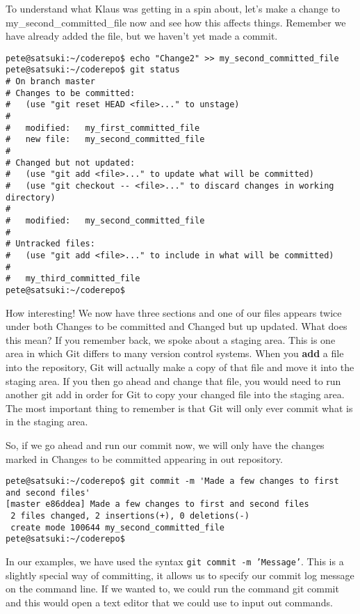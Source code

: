 To understand what Klaus was getting in a spin about, let's make a change to my\_second\_committed\_file now and see how this affects things.  Remember we have already added the file, but we haven't yet made a commit.

\begin{verbatim} 
pete@satsuki:~/coderepo$ echo "Change2" >> my_second_committed_file 
pete@satsuki:~/coderepo$ git status
# On branch master
# Changes to be committed:
#   (use "git reset HEAD <file>..." to unstage)
#
#	modified:   my_first_committed_file
#	new file:   my_second_committed_file
#
# Changed but not updated:
#   (use "git add <file>..." to update what will be committed)
#   (use "git checkout -- <file>..." to discard changes in working directory)
#
#	modified:   my_second_committed_file
#
# Untracked files:
#   (use "git add <file>..." to include in what will be committed)
#
#	my_third_committed_file
pete@satsuki:~/coderepo$ 
\end{verbatim} 

How interesting!  We now have three sections and one of our files appears twice under both Changes to be committed and Changed but up updated.  What does this mean?  If you remember back, we spoke about a staging area.  This is one area in which Git differs to many version control systems.  When you \textbf{add} a file into the repository, Git will actually make a copy of that file and move it into the staging area.  If you then go ahead and change that file, you would need to run another git add in order for Git to copy your changed file into the staging area.  The most important thing to remember is that Git will only ever commit what is in the staging area.

So, if we go ahead and run our commit now, we will only have the changes marked in Changes to be committed appearing in out repository.  

\begin{verbatim} 
pete@satsuki:~/coderepo$ git commit -m 'Made a few changes to first and second files'
[master e86ddea] Made a few changes to first and second files
 2 files changed, 2 insertions(+), 0 deletions(-)
 create mode 100644 my_second_committed_file
pete@satsuki:~/coderepo$ 
\end{verbatim} 

In our examples, we have used the syntax \texttt{git commit -m 'Message'}.  This is a slightly special way of committing, it allows us to specify our commit log message on the command line.  If we wanted to, we could run the command git commit and this would open a text editor that we could use to input out commands.

